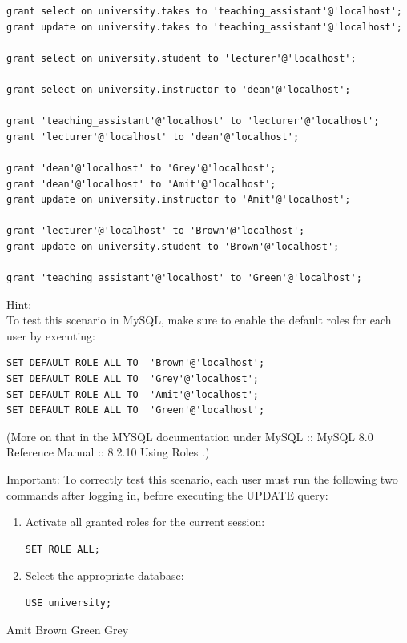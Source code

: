 \documentclass[12pt, addpoints, answers]{exam}
\begin{document}
\begin{questions}
\begin{samepage}
\begin{verbatim}
grant select on university.takes to 'teaching_assistant'@'localhost';
grant update on university.takes to 'teaching_assistant'@'localhost';

grant select on university.student to 'lecturer'@'localhost';

grant select on university.instructor to 'dean'@'localhost';

grant 'teaching_assistant'@'localhost' to 'lecturer'@'localhost';
grant 'lecturer'@'localhost' to 'dean'@'localhost';

grant 'dean'@'localhost' to 'Grey'@'localhost';
grant 'dean'@'localhost' to 'Amit'@'localhost';
grant update on university.instructor to 'Amit'@'localhost';

grant 'lecturer'@'localhost' to 'Brown'@'localhost';
grant update on university.student to 'Brown'@'localhost';

grant 'teaching_assistant'@'localhost' to 'Green'@'localhost';
\end{verbatim}

Hint: \\
To test this scenario in MySQL, make sure to enable the default roles for each user by executing:\par\vspace{0.5em}
\begin{verbatim}
SET DEFAULT ROLE ALL TO  'Brown'@'localhost';
SET DEFAULT ROLE ALL TO  'Grey'@'localhost';
SET DEFAULT ROLE ALL TO  'Amit'@'localhost';
SET DEFAULT ROLE ALL TO  'Green'@'localhost';
\end{verbatim}
(More on that in the MYSQL documentation under MySQL :: MySQL 8.0 Reference Manual :: 8.2.10 Using Roles .)

Important: To correctly test this scenario, each user must run the following two commands after logging in, before executing the UPDATE query:\par\vspace{0.5em}
\begin{enumerate}
    \item Activate all granted roles for the current session:
    \begin{verbatim}
SET ROLE ALL;
    \end{verbatim}

    \item Select the appropriate database:
    \begin{verbatim}
USE university;
    \end{verbatim}
\end{enumerate}
\begin{checkboxes}
    \CorrectChoice Amit
    \CorrectChoice Brown
    \choice Green
    \CorrectChoice Grey
\end{checkboxes}
\vspace{1em}
\end{samepage}


\end{questions}
\end{document}
